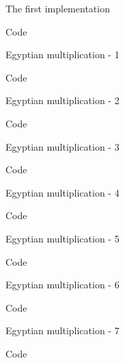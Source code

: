 \documentclass[10pt]{beamer}
\begin{document}
\begin{frame}[fragile]{The first implementation}
\begin{block}{Code}\end{block}
\end{frame}

\begin{frame}[fragile]{Egyptian multiplication - 1}
\begin{block}{Code}\end{block}
\end{frame}

\begin{frame}[fragile]{Egyptian multiplication - 2}
\begin{block}{Code}\end{block}
\end{frame}

\begin{frame}[fragile]{Egyptian multiplication - 3}
\begin{block}{Code}\end{block}
\end{frame}

\begin{frame}[fragile]{Egyptian multiplication - 4}
\begin{block}{Code}\end{block}
\end{frame}

\begin{frame}[fragile]{Egyptian multiplication - 5}
\begin{block}{Code}\end{block}
\end{frame}

\begin{frame}[fragile]{Egyptian multiplication - 6}
\begin{block}{Code}\end{block}
\end{frame}

\begin{frame}[fragile]{Egyptian multiplication - 7}
\begin{block}{Code}\end{block}
\end{frame}
\end{document}
